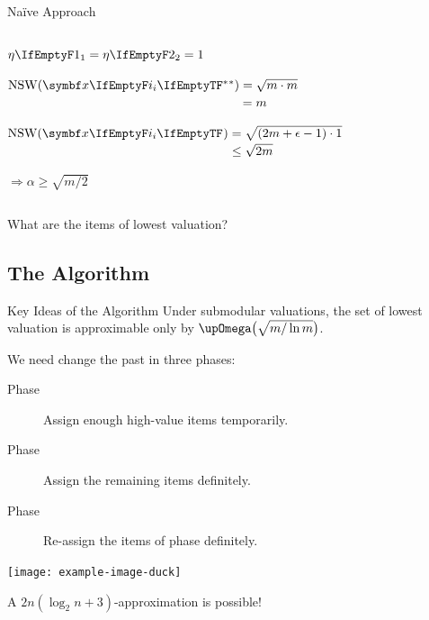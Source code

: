 \begin{frame}{Naïve Approach}
\begin{columns}[c]
\begin{column}{.3\textwidth}
			\(\weight[1] = \weight[2] = 1\)

			\medskip

			\(\NSW(\alloc*) = \sqrt{m \cdot m}\) \\
			\(\hphantom{\NSW(\alloc*)} = m\)

			\smallskip

			\(\NSW(\alloc) = \sqrt{ (2m + \epsilon - 1) \cdot 1 }\)
			\(\hphantom{\NSW(\alloc)} \le \sqrt{2m}\)

			\medskip

			\(\Rightarrow \alpha \ge \sqrt{m/2} \)
		\end{column}
		\begin{column}{.7\textwidth}
			\centering
			\allocationexample
			\hfil
			\allocationexample
		\end{column}
	\end{columns}
	\begin{block}{}
		What are the items of lowest valuation?\phantom{g}  %
	\end{block}
\end{frame}





\subsection{The Algorithm}
\begin{frame}{Key Ideas of the Algorithm}
	Under submodular valuations, the set of lowest valuation is approximable only by \(\bigomega\paren[\big]{ \sqrt{m/\ln m} }\). \smash{\raisebox{-.25ex}{\Large\Lightning}}

	We need change the past in three phases:
	\begin{description}
		\item[Phase \phasei]
		Assign enough high-value items temporarily.

		\item[Phase \phaseii]
		Assign the remaining items definitely.

		\item[Phase \phaseiii]
		Re-assign the items of phase \phasei{} definitely.
	\end{description}
	\begin{center}
		\texttt{[image: example-image-duck]}
	\end{center}
	\begin{exampleblock}{}
		A \(2n (\log_2 n + 3)\)-approximation is possible!
	\end{exampleblock}
\end{frame}

